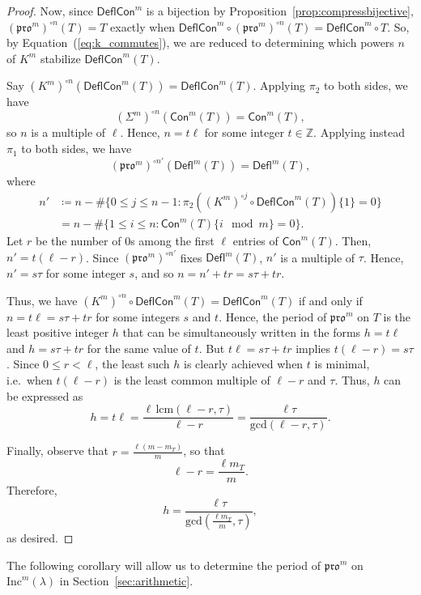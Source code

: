 \documentclass[12pt]{amsart}
\theoremstyle{definition}
\theoremstyle{remark}
\numberwithin{equation}{section}
\newcommand{\inc}{\ensuremath{\mathrm{Inc}}}
\newcommand{\pro}{\mathfrak{pro}}
\newcommand{\deflate}{\ensuremath{\mathsf{Defl}}}
\newcommand{\content}{\ensuremath{\mathsf{Con}}}
\newcommand{\compress}{\ensuremath{\mathsf{DeflCon}}}
\begin{document}
\begin{proof}
Now, since $\compress^m$ is a bijection by Proposition~\ref{prop:compressbijective}, $(\pro^m)^{\circ n}(T) = T$ exactly when $\compress^m \circ (\pro^m)^{\circ n}(T) = \compress^m \circ T$. So, by Equation~(\ref{eq:k_commutes}), we are reduced to determining which powers $n$ of $K^m$ stabilize $\compress^m(T)$.
 

 
Say $(K^m)^{\circ n}(\compress^m(T)) = \compress^m(T)$. Applying $\pi_2$ to both sides, we have \[ (\Sigma^m)^{\circ n}(\content^m(T)) = \content^m(T), \] so $n$ is a multiple of $\ell$. Hence, $n = t \ell$ for some integer $t \in \mathbb{Z}$.  Applying instead $\pi_1$ to both sides, we have \[ (\pro^m)^{\circ n'}(\deflate^m(T)) = \deflate^m(T), \] where 
\begin{align*}
n' &\coloneqq n - \# \{ 0 \leq j \leq n-1 : \pi_2 ((K^m)^{\circ j} \circ \compress^m(T)) \lbrace 1 \rbrace = 0\} \\
&= n - \#  \{ 1 \leq i \leq n : \content^m(T) \lbrace i \mod m \rbrace = 0\}.
\end{align*}
Let $r$ be the number of $0$s among the first $\ell$ entries of $\content^m(T)$. Then, $n' = t(\ell - r)$. Since $(\pro^m)^{\circ n'}$ fixes $\deflate^m(T)$, $n'$ is a multiple of $\tau$. Hence, $n' = s \tau$ for some integer $s$, and so $n = n' + tr = s\tau + tr$.

Thus, we have $(K^m)^{\circ n}  \circ \compress^m(T) = \compress^m(T)$ if and only if $n = t \ell = s \tau + t  r$ for some integers $s$ and $t$. Hence, the period of $\pro^m$ on $T$ is the least positive integer $h$ that can be simultaneously written in the forms $h = t \ell$ and $h=s \tau + t r$ for the same value of $t$. But $t \ell = s\tau + tr$ implies $t(\ell-r) = s\tau$. Since $0 \leq r < \ell$, the least such $h$ is clearly achieved when $t$ is minimal, i.e.\ when $t(\ell-r)$ is the least common multiple of $\ell-r$ and $\tau$. Thus, $h$ can be expressed as 
\begin{equation}\label{eq:period}
h = t \ell = \frac{\ell \, \text{lcm}(\ell-r,\tau)}{\ell-r} = \frac{\ell \tau}{\text{gcd}(\ell-r,\tau)}.
\end{equation}

Finally, observe that $r = \frac{\ell (m-m_T)}{m}$, so that \[ \ell - r = \frac{\ell m_T}{m}.\]
Therefore,
\[ h = \frac{\ell \tau}{\text{gcd}(\frac{\ell m_T}{m},\tau)}, \]
as desired. 
\end{proof}

The following corollary will allow us to determine the period of $\pro^m$ on $\inc^m(\lambda)$ in Section~\ref{sec:arithmetic}. 
\end{document}
